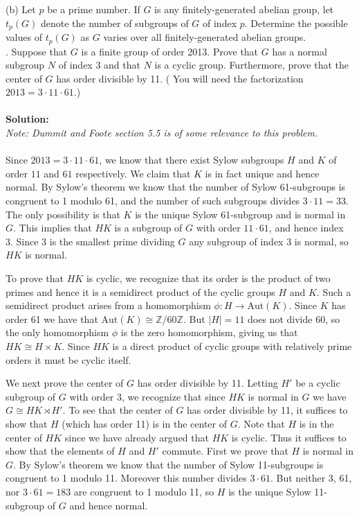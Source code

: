 \documentclass[11pt]{article}
\newcommand{\Z}{\mathbb{Z}}
\begin{document}
(b) Let $p$ be a prime number. If $G$ is any finitely-generated abelian group, let $t_p(G)$ denote
the number of subgroups of $G$ of index $p$. Determine the possible values of $t_p(G)$ as $G$ varies
over all finitely-generated abelian groups.\\
. Suppose that $G$ is a finite group of order 2013. Prove that $G$ has a normal
subgroup $N$ of index 3 and that $N$ is a cyclic group. Furthermore, prove that the center of
$G$ has order divisible by 11. ( You will need the factorization $2013 = 3 \cdot  11 \cdot 61$.)\\\\\textbf{Solution:}\\
\emph{Note: Dummit and Foote section 5.5 is of some relevance to this problem.}\\\\
Since $2013 = 3\cdot 11 \cdot 61$, we know that there exist Sylow subgroups $H$ and $K$ of order $11$ and $61$ respectively. We claim that $K$ is in fact unique and hence normal. By Sylow's theorem we know that the number of Sylow 61-subgroups is congruent to 1 modulo 61, and the number of such subgroups divides $3\cdot 11 = 33$. The only possibility is that $K$ is the unique Sylow 61-subgroup and is normal in $G$. This implies that $HK$ is a subgroup of $G$ with order $11\cdot 61$, and hence index 3. Since 3 is the smallest prime dividing $G$ any subgroup of index 3 is normal, so $HK$ is normal.

To prove that $HK$ is cyclic, we recognize that its order is the product of two primes and hence it is a semidirect product of the cyclic groups $H$ and $K$. Such a semidirect product arises from a homomorphism $\phi:H\to \mbox{Aut}(K)$. Since $K$ has order 61 we have that $\mbox{Aut}(K) \cong \Z/60\Z$. But $|H| = 11$ does not 	divide 60, so the only homomorphism $\phi$ is the zero homomorphism, giving us that $HK \cong H\times K$. Since $HK$ is a direct product of cyclic groups with relatively prime orders it must be cyclic itself.

We next prove the center of $G$ has order divisible by 11. Letting $H'$ be a cyclic subgroup of $G$ with order 3, we recognize that since $HK$ is normal in $G$ we have $G\cong HK \rtimes H'$. To see that the center of $G$ has order divisible by 11, it suffices to show that $H$ (which has order 11) is in the center of $G$. Note that $H$ is in the center of $HK$ since we have already argued that $HK$ is cyclic. Thus it suffices to show that the elements of $H$ and $H'$ commute. First we prove that $H$ is normal in $G$. By Sylow's theorem we know that the number of Sylow 11-subgroups is congruent to 1 modulo 11. Moreover this number divides $3\cdot 61$. But neither 3, 61, nor $3\cdot 61 = 183$ are congruent to 1 modulo 11, so $H$ is the unique Sylow 11-subgroup of $G$ and hence normal.
\end{document}
